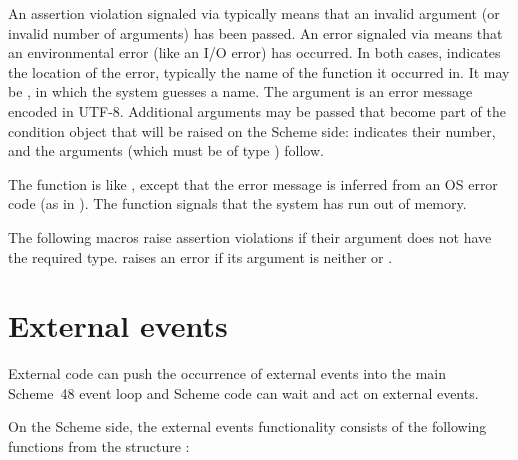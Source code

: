 \noindent{}An assertion violation signaled via
 typically means that an invalid
argument (or invalid number of arguments) has been passed.  An error
signaled via  means that an environmental error
(like an I/O error) has occurred.  In both cases,  indicates
the location of the error, typically the name of the function it
occurred in.  It may be , in which the system guesses a
name.  The  argument is an error message encoded in
UTF-8.  Additional arguments may be passed that become part of the
condition object that will be raised on the Scheme side: 
indicates their number, and the arguments (which must be of type
) follow.

The  function is like , except
that the error message is inferred from an OS error code (as in
).  The  function
signals that the system has run out of memory.

The following macros raise assertion violations if their argument does
not have the required type.   raises an
error if its argument is neither  or .

\begin{protos}
\end{protos}

\section{External events}

External code can push the occurrence of external events into the main
Scheme~48 event loop and Scheme code can wait and act on external
events.

On the Scheme side, the external events functionality consists of the
following functions from the structure :

